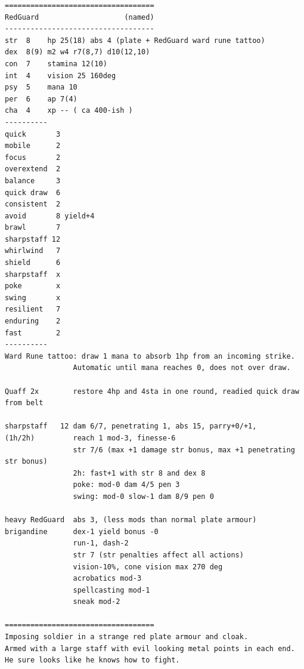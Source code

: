 \goodbreak \begin{samepage} \vsmall \begin{verbatim}
===================================
RedGuard                    (named)
-----------------------------------
str  8    hp 25(18) abs 4 (plate + RedGuard ward rune tattoo)
dex  8(9) m2 w4 r7(8,7) d10(12,10)
con  7    stamina 12(10)
int  4    vision 25 160deg
psy  5    mana 10
per  6    ap 7(4)
cha  4    xp -- ( ca 400-ish )
----------
quick       3
mobile      2
focus       2
overextend  2
balance     3
quick draw  6
consistent  2
avoid       8 yield+4
brawl       7
sharpstaff 12
whirlwind   7
shield      6
sharpstaff  x
poke        x
swing       x
resilient   7
enduring    2
fast        2
----------
Ward Rune tattoo: draw 1 mana to absorb 1hp from an incoming strike.
                Automatic until mana reaches 0, does not over draw.

Quaff 2x        restore 4hp and 4sta in one round, readied quick draw from belt

sharpstaff   12 dam 6/7, penetrating 1, abs 15, parry+0/+1,
(1h/2h)         reach 1 mod-3, finesse-6
                str 7/6 (max +1 damage str bonus, max +1 penetrating str bonus)
                2h: fast+1 with str 8 and dex 8
                poke: mod-0 dam 4/5 pen 3
                swing: mod-0 slow-1 dam 8/9 pen 0

heavy RedGuard  abs 3, (less mods than normal plate armour)
brigandine      dex-1 yield bonus -0
                run-1, dash-2
                str 7 (str penalties affect all actions)
                vision-10%, cone vision max 270 deg
                acrobatics mod-3
                spellcasting mod-1
                sneak mod-2

===================================
Imposing soldier in a strange red plate armour and cloak.
Armed with a large staff with evil looking metal points in each end.
He sure looks like he knows how to fight.
\end{verbatim} \normalsize \end{samepage}

\

